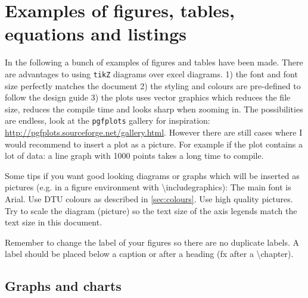 \chapter{Examples of figures, tables, equations and listings}
In the following a bunch of examples of figures and tables have been made. There are advantages to using \texttt{tikZ} diagrams over excel diagrams. 1) the font and font size perfectly matches the document 2) the styling and colours are pre-defined to follow the design guide 3) the plots uses vector graphics which reduces the file size, reduces the compile time and looks sharp when zooming in. The possibilities are endless, look at the \texttt{pgfplots} gallery for inspiration: \url{http://pgfplots.sourceforge.net/gallery.html}. 
However there are still cases where I would recommend to insert a plot as a picture. For example if the plot contains a lot of data: a line graph with 1000 points takes a long time to compile. 

Some tips if you want good looking diagrams or graphs which will be inserted as pictures (e.g. in a figure environment with \textbackslash includegraphics): The main font is Arial. Use DTU colours as described in \cref{sec:colours}. Use high quality pictures. Try to scale the diagram (picture) so the text size of the axis legends match the text size in this document.

Remember to change the label of your figures so there are no duplicate labels. A label should be placed below a caption or after a heading (fx after a \textbackslash chapter). 





\section{Graphs and charts}

\stackedColumnData

